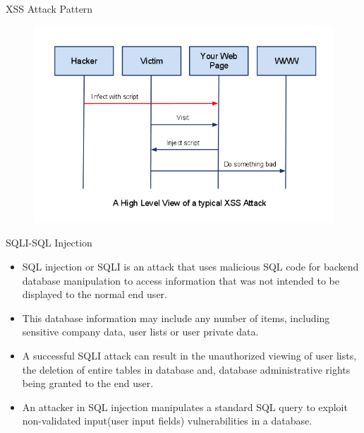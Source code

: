 \documentclass{beamer}
\begin{document}
\begin{frame}{XSS Attack Pattern}
 \begin{figure}[h]
    \centering
    \includegraphics[scale=0.6]{MTP4.png}
\end{figure}
\end{frame}


\begin{frame}{SQLI-SQL Injection}
\begin{itemize}
    \item SQL injection or SQLI is an attack that uses malicious SQL code for backend database manipulation to access information that was not intended to be displayed to the normal end user. 
    \item This database information may include any number of items, including sensitive company data, user lists or user private data.
    \item A successful SQLI attack can result in the unauthorized viewing of user lists, the deletion of entire tables in database and, database administrative rights being granted to the end user.
    \item An attacker in SQL injection manipulates a standard SQL query to exploit non-validated input(user input fields) vulnerabilities in a database.
\end{itemize}    
\end{frame}
\end{document}
